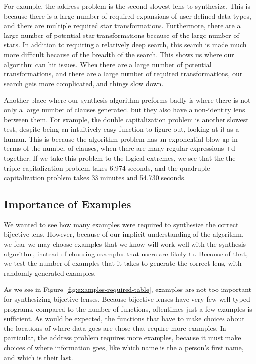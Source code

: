\documentclass[numbers]{sigplanconf}
\begin{document}
For example, the address problem is the second slowest lens to synthesize.
This is because there is a large number of required expansions of user defined
data types, and there are multiple required star transformations.
Furthermore, there are a large number of potential star transformations because
of the large number of stars.
In addition to requiring a relatively deep search, this search is made much
more difficult because of the breadth of the search.
This shows us where our algorithm can hit issues.
When there are a large number of potential transformations, and there are a
large number of required transformations, our search gets more complicated,
and things slow down.

Another place where our synthesis algorithm preforms badly is where there is not
only a large number of clauses generated, but they also have a non-identity
lens between them.
For example, the double capitalization problem is another slowest test, despite
being an intuitively easy function to figure out, looking at it as a human.
This is because the algorithm problem has an exponential blow up in terms
of the number of clauses, when there are many regular expressions +d together.
If we take this problem to the logical extremes, we see that the the triple
capitalization problem takes 6.974 seconds, and the quadruple capitalization
problem takes 33 minutes and 54.730 seconds.

\subsection{Importance of Examples}
We wanted to see how many examples were required to synthesize the correct
bijective lens.
However, because of our implicit understanding of the algorithm, we fear we may
choose examples that we know will work well with the synthesis algorithm,
instead of choosing examples that users are likely to.
Because of that, we test the number of examples that it takes to generate the
correct lens, with randomly generated examples.


As we see in Figure~\ref{fig:examples-required-table}, examples are not too
important for synthesizing bijective lenses.
Because bijective lenses have very few well typed programs, compared to the
number of functions, oftentimes just a few examples is sufficient.
As would be expected, the functions that have to make choices about the
locations of where data goes are those that require more examples.
In particular, the address problem requires more examples, because it must make
choices of where information goes, like which name is the a person's first name,
and which is their last.
\end{document}

